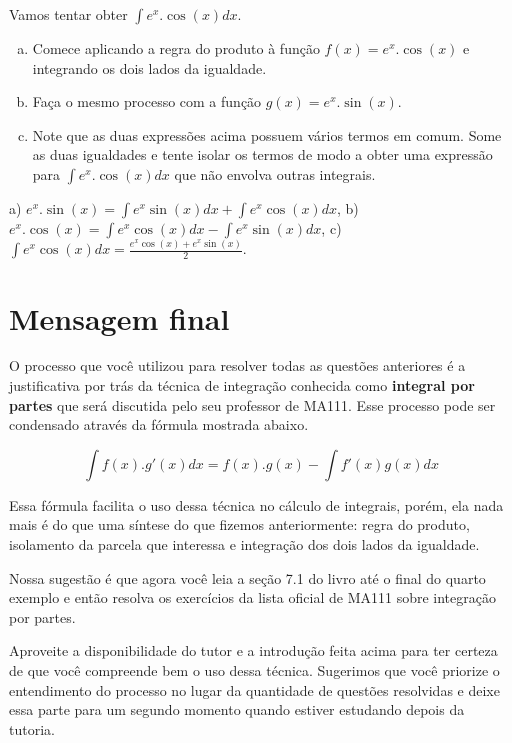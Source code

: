 \documentclass[main_estudante.tex]{subfiles}
\begin{document}
\begin{questao}
Vamos tentar obter $\int e^x.\cos(x) dx$.
\begin{enumerate}[a)]
\item Comece aplicando a regra do produto à função $f(x)=e^x.\cos(x)$ e integrando os dois lados da igualdade.
\item Faça o mesmo processo com a função $g(x)=e^x.\sin(x)$.
\item Note que as duas expressões acima possuem vários termos em comum. Some as duas igualdades e tente isolar os termos de modo a obter uma expressão para $\int e^x.\cos(x) dx$ que não envolva outras integrais.
\end{enumerate}
\end{questao}

\begin{gabarito}
	\begin{gabaritoQuestao}
		a) $e^x.\sin(x)= \int e^x\sin(x)dx + \int e^x\cos(x)dx$, b) $e^x.\cos(x)= \int e^x\cos(x)dx - \int e^x\sin(x)dx$, c) $\int e^x\cos(x)dx = \frac{e^x\cos(x)+e^x\sin(x)}{2}$.
	\end{gabaritoQuestao}
\end{gabarito}

\section{Mensagem final}

O processo que você utilizou para resolver todas as questões anteriores é a justificativa por trás da técnica de integração conhecida como \textbf{integral por partes} que será discutida pelo seu professor de MA111. Esse processo pode ser condensado através da fórmula mostrada abaixo.

\begin{shaded*}
$$\int f(x).g'(x)dx = f(x).g(x)-\int f'(x)g(x)dx$$
\end{shaded*}

Essa fórmula facilita o uso dessa técnica no cálculo de integrais, porém, ela nada mais é do que uma síntese do que fizemos anteriormente: regra do produto, isolamento da parcela que interessa e integração dos dois lados da igualdade.

Nossa sugestão é que agora você leia a seção 7.1 do livro  até o final do quarto exemplo e então resolva os exercícios da lista oficial de MA111 sobre integração por partes.

Aproveite a disponibilidade do tutor e a introdução feita acima para ter certeza de que você compreende bem o uso dessa técnica. Sugerimos que você priorize o entendimento do processo no lugar da quantidade de questões resolvidas e deixe essa parte para um segundo momento quando estiver estudando depois da tutoria.
\end{document}
